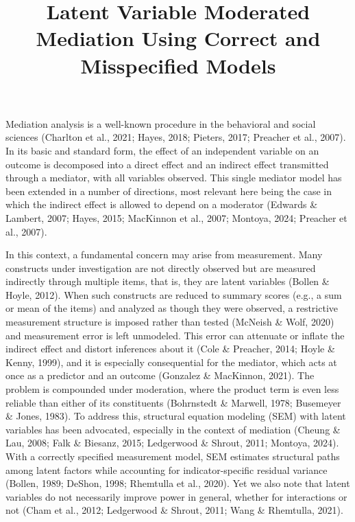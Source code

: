 \documentclass[
  man,
  longtable,
  nolmodern,
  notxfonts,
  notimes,
  colorlinks=true,linkcolor=blue,citecolor=blue,urlcolor=blue]{apa7}
\title{Latent Variable Moderated Mediation Using Correct and
Misspecified Models}
\affiliation{
{Department of Data Analysis, Faculty of Psychology and Educational
Sciences, Ghent University}}
\begin{document}
\maketitle




\setlength\LTleft{0pt}




Mediation analysis is a well-known procedure in the behavioral and
social sciences (Charlton et al., 2021; Hayes, 2018; Pieters, 2017;
Preacher et al., 2007). In its basic and standard form, the effect of an
independent variable on an outcome is decomposed into a direct effect
and an indirect effect transmitted through a mediator, with all
variables observed. This single mediator model has been extended in a
number of directions, most relevant here being the case in which the
indirect effect is allowed to depend on a moderator (Edwards \& Lambert,
2007; Hayes, 2015; MacKinnon et al., 2007; Montoya, 2024; Preacher et
al., 2007).

In this context, a fundamental concern may arise from measurement. Many
constructs under investigation are not directly observed but are
measured indirectly through multiple items, that is, they are latent
variables (Bollen \& Hoyle, 2012). When such constructs are reduced to
summary scores (e.g., a sum or mean of the items) and analyzed as though
they were observed, a restrictive measurement structure is imposed
rather than tested (McNeish \& Wolf, 2020) and measurement error is left
unmodeled. This error can attenuate or inflate the indirect effect and
distort inferences about it (Cole \& Preacher, 2014; Hoyle \& Kenny,
1999), and it is especially consequential for the mediator, which acts
at once as a predictor and an outcome (Gonzalez \& MacKinnon, 2021). The
problem is compounded under moderation, where the product term is even
less reliable than either of its constituents (Bohrnstedt \& Marwell,
1978; Busemeyer \& Jones, 1983). To address this, structural equation
modeling (SEM) with latent variables has been advocated, especially in
the context of mediation (Cheung \& Lau, 2008; Falk \& Biesanz, 2015;
Ledgerwood \& Shrout, 2011; Montoya, 2024). With a correctly specified
measurement model, SEM estimates structural paths among latent factors
while accounting for indicator-specific residual variance (Bollen, 1989;
DeShon, 1998; Rhemtulla et al., 2020). Yet we also note that latent
variables do not necessarily improve power in general, whether for
interactions or not (Cham et al., 2012; Ledgerwood \& Shrout, 2011; Wang
\& Rhemtulla, 2021).
\end{document}
